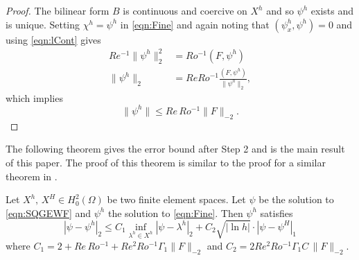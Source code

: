 \begin{proof}
  The bilinear form $B$ is continuous and coercive on $X^h$ and so $\psi^h$
  exists and is unique. Setting $\chi^h=\psi^h$ in \eqref{eqn:Fine} and again
  noting that $(\psi_x^h,\psi^h)=0$ and using \eqref{eqn:lCont} gives
  \begin{align*}
    Re^{-1} \|\psi^h\|_2^2 &= Ro^{-1} (F,\psi^h) \\
    \|\psi^h\|_2 &= Re Ro^{-1} \frac{(F,\psi^h)}{\|\psi^h\|_2},
  \end{align*}
  which implies
  \begin{equation*}
    \|\psi^h\| \le Re\, Ro^{-1} \|F\|_{-2}.
  \end{equation*}
\end{proof}

The following theorem gives the error bound after Step 2 and is the main result
of this paper. The proof of this theorem is similar to the proof for a similar
theorem in \cite{Fairag98}.
\begin{thm} \label{thm:2LTwoLevel}
  Let $X^h,\, X^H\in H^2_0(\Omega)$ be two finite element spaces. Let $\psi$ be
  the solution to \eqref{eqn:SQGEWF} and $\psi^h$ the solution to
  \eqref{eqn:Fine}. Then $\psi^h$ satisfies
  \begin{equation}
    |\psi-\psi^h|_2 \le C_1 \inf_{\lambda^h\in X^h} |\psi-\lambda^h|_2 + C_2 \sqrt{|\ln h|}\cdot |\psi - \psi^H|_1
    \label{eqn:Error}
  \end{equation}
  where $C_1 = 2 + Re\,Ro^{-1} + Re^2 Ro^{-1} \Gamma_1 \|F\|_{-2}$ and $C_2= 2
  Re^2 Ro^{-1} \Gamma_1 C\,\|F\|_{-2}$.
\end{thm}

